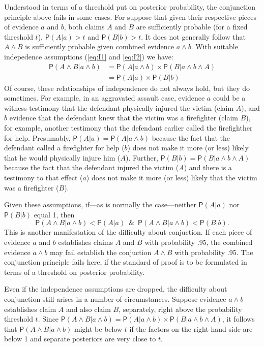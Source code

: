\documentclass[
  10pt,
  dvipsnames,enabledeprecatedfontcommands]{scrartcl}
\newcommand{\et}{\wedge}
\newcommand{\pr}[1]{\mathsf{P}(#1)}
\begin{document}
Understood in terms of a threshold put on posterior probability, the
conjunction principle above fails in some
cases.
For suppose that given their respective pieces of evidence \(a\) and
\(b\), both claims \(A\) and \(B\) are sufficiently probable (for a
fixed threshold \(t\)), \(\pr{A \vert a}>t\) and \(\pr{B \vert b}>t\).
It does not generally follow that \(A \et B\) is sufficiently probable
given combined evidence \(a\et b\). With suitable indepedence
assumptions (\eqref{eq:I1} and \eqref{eq:I2}) we have: \begin{align*}
\pr{A \wedge  B \vert a \wedge b}& =\pr{A \vert a \wedge b} \times \pr{B \vert  a \wedge b \wedge A}\\
 & = \pr{A \vert a} \times \pr{B \vert  b}
 \end{align*} \noindent Of course, these relationships of independence
do not always hold, but they do sometimes. For example, in an aggravated
assault case, evidence \(a\) could be a witness testimony that the
defendant physically injured the victim (claim \(A\)), and \(b\)
evidence that the defendant knew that the victim was a firefighter
(claim \(B\)), for example, another testimony that the defendant earlier
called the firefighther for help. Presumably,
\(\pr{A \vert a}=\pr{A \vert a \wedge b}\) because the fact that the
defendant called a firefighter for help (\(b\)) does not make it more
(or less) likely that he would physically injure him (\(A\)). Further,
\(\pr{B \vert b}=\pr{B \vert a \wedge b \wedge A}\) because the fact
that the defendant injured the victim (\(A\)) and there is a testimony
to that effect (\(a\)) does not make it more (or less) likely that the
victim was a firefighter (\(B\)).

Given these assumptions, if---as is normally the case---neither
\(\pr{A \vert a}\) nor \(\pr{B \vert b}\) equal 1, then
\[\pr{A \wedge B \vert a \wedge b}< \pr{A \vert a} \;\ \& \;\ \pr{A \wedge B \vert a \wedge b} < \pr{B \vert b}. \]
This is another manifestation of the difficulty about conjuction. If
each piece of evidence \(a\) and \(b\) establishes claims \(A\) and
\(B\) with probability .95, the combined evidence \(a\et b\) may fail
establish the conjuction \(A\et B\) with probability .95. The
conjunction principle fails here, if the standard of proof is to be
formulated in terms of a threshold on posterior probability.

Even if the independence assumptions are dropped, the difficulty about
conjunction still arises in a number of circumstances. Suppose evidence
\(a\et b\) establishes claim \(A\) and also claim \(B\), separately,
right above the probability threshold \(t\). Since
\(\pr{A \wedge B \vert a \wedge b} =\pr{A \vert a \wedge b} \times \pr{B \vert a \wedge b \wedge A}\),
it follows that \(\pr{A \wedge B \vert a \wedge b}\) might be below
\(t\) if the factors on the right-hand side are below 1 and separate
posteriors are very close to \(t\).
\end{document}
